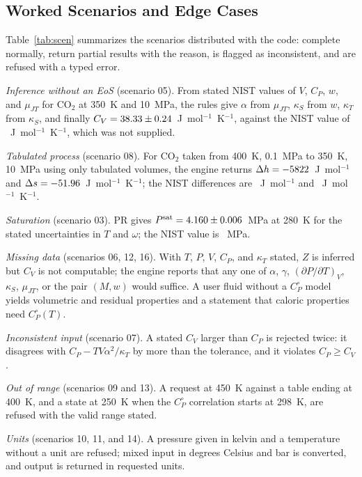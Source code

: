 \documentclass[journal=iecred,manuscript=article,layout=twocolumn]{achemso}
\newcommand{\Cpo}{C_P^{\circ}}
\begin{document}
\subsection{Worked Scenarios and Edge Cases}

Table~\ref{tab:scen} summarizes the \NScen{} scenarios distributed with the
code: \NScenOK{} complete normally, \NScenPartial{} return partial results with
the reason, \NScenIncons{} is flagged as inconsistent, and \NScenError{} are
refused with a typed error.

\emph{Inference without an EoS} (scenario 05). From stated NIST values of $V$,
$C_P$, $w$, and $\mu_{JT}$ for CO$_2$ at 350~K and 10~MPa, the rules give
$\alpha$ from $\mu_{JT}$, $\kappa_S$ from $w$, $\kappa_T$ from $\kappa_S$, and
finally $C_V = 38.33 \pm 0.24$~J~mol$^{-1}$~K$^{-1}$, against the NIST value
of \InfCvNist~J~mol$^{-1}$~K$^{-1}$, which was not supplied.

\emph{Tabulated process} (scenario 08). For CO$_2$ taken from 400~K, 0.1~MPa to
350~K, 10~MPa using only tabulated volumes, the engine returns
$\Delta h = -5822$~J~mol$^{-1}$ and
$\Delta s = -51.96$~J~mol$^{-1}$~K$^{-1}$; the NIST differences are
\TabScendHNist~J~mol$^{-1}$ and \TabScendSNist~J~mol$^{-1}$~K$^{-1}$.

\emph{Saturation} (scenario 03). PR gives
$P^{\mathrm{sat}} = 4.160 \pm 0.006$~MPa at 280~K for the stated uncertainties
in $T$ and $\omega$; the NIST value is \SatPNist~MPa.

\emph{Missing data} (scenarios 06, 12, 16). With $T$, $P$, $V$, $C_P$, and
$\kappa_T$ stated, $Z$ is inferred but $C_V$ is not computable; the engine
reports that any one of $\alpha$, $\gamma$, $(\partial P/\partial T)_V$,
$\kappa_S$, $\mu_{JT}$, or the pair $(M, w)$ would suffice. A user fluid without
a $\Cpo$ model yields volumetric and residual properties and a statement that
caloric properties need $\Cpo(T)$.

\emph{Inconsistent input} (scenario 07). A stated $C_V$ larger than $C_P$ is
rejected twice: it disagrees with $C_P - TV\alpha^2/\kappa_T$ by more than the
tolerance, and it violates $C_P \ge C_V$.

\emph{Out of range} (scenarios 09 and 13). A request at 450~K against a table
ending at 400~K, and a state at 250~K when the $\Cpo$ correlation starts at
298~K, are refused with the valid range stated.

\emph{Units} (scenarios 10, 11, and 14). A pressure given in kelvin and a
temperature without a unit are refused; mixed input in degrees Celsius and bar
is converted, and output is returned in requested units.
\end{document}

